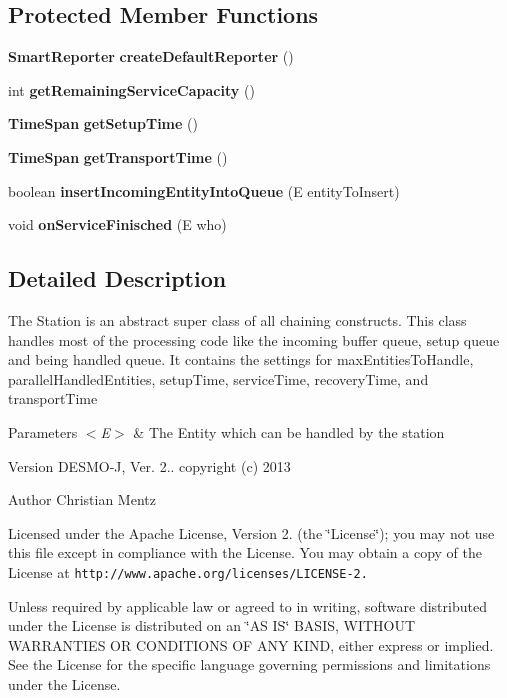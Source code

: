 \subsection*{Protected Member Functions}
\begin{DoxyCompactItemize}
\item 
{\bf Smart\-Reporter} {\bf create\-Default\-Reporter} ()
\item 
int {\bf get\-Remaining\-Service\-Capacity} ()
\item 
{\bf Time\-Span} {\bf get\-Setup\-Time} ()
\item 
{\bf Time\-Span} {\bf get\-Transport\-Time} ()
\item 
boolean {\bf insert\-Incoming\-Entity\-Into\-Queue} (E entity\-To\-Insert)
\item 
void {\bf on\-Service\-Finisched} (E who)
\end{DoxyCompactItemize}


\subsection{Detailed Description}
The Station is an abstract super class of all chaining constructs. This class handles most of the processing code like the incoming buffer queue, setup queue and being handled queue. It contains the settings for max\-Entities\-To\-Handle, parallel\-Handled\-Entities, setup\-Time, service\-Time, recovery\-Time, and transport\-Time


\begin{DoxyParams}{Parameters}
{\em $<$\-E$>$} & The Entity which can be handled by the station\\
\hline
\end{DoxyParams}
\begin{DoxyVersion}{Version}
D\-E\-S\-M\-O-\/\-J, Ver. 2.. copyright (c) 2013 
\end{DoxyVersion}
\begin{DoxyAuthor}{Author}
Christian Mentz
\end{DoxyAuthor}
Licensed under the Apache License, Version 2. (the \char`\"{}\-License\char`\"{}); you may not use this file except in compliance with the License. You may obtain a copy of the License at {\tt http\-://www.\-apache.\-org/licenses/\-L\-I\-C\-E\-N\-S\-E-\/2.}

Unless required by applicable law or agreed to in writing, software distributed under the License is distributed on an \char`\"{}\-A\-S I\-S\char`\"{} B\-A\-S\-I\-S, W\-I\-T\-H\-O\-U\-T W\-A\-R\-R\-A\-N\-T\-I\-E\-S O\-R C\-O\-N\-D\-I\-T\-I\-O\-N\-S O\-F A\-N\-Y K\-I\-N\-D, either express or implied. See the License for the specific language governing permissions and limitations under the License. 

